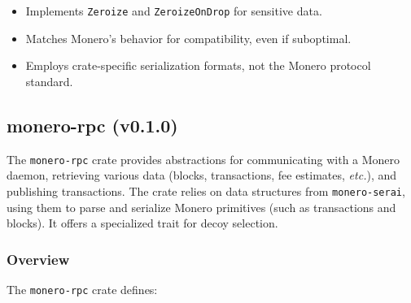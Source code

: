 \begin{itemize}
  \item Implements \texttt{Zeroize} and \texttt{ZeroizeOnDrop} for sensitive data.
  \item Matches Monero's behavior for compatibility, even if suboptimal.
  \item Employs crate-specific serialization formats, not the Monero protocol standard.
\end{itemize}


\subsection{monero-rpc (v0.1.0)}
\label{sec:monero-rpc-crate}

The \texttt{monero-rpc} crate provides abstractions for
communicating with a Monero daemon, retrieving various data (blocks, transactions,
fee estimates, \emph{etc.}), and publishing transactions.  The crate relies on data
structures from \texttt{monero-serai}, using them to parse and serialize Monero
primitives (such as transactions and blocks).  It offers a specialized trait for
decoy selection.

\subsubsection{Overview}
\label{sec:monero-rpc-overview}

The \texttt{monero-rpc} crate defines:

